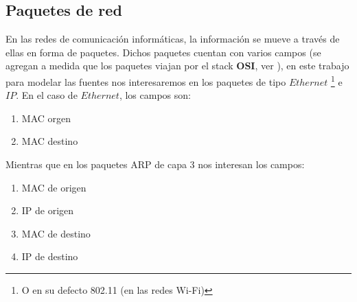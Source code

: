 \subsection{Paquetes de red}

En las redes de comunicación informáticas, la información se mueve a través de
ellas en forma de paquetes. Dichos paquetes cuentan con varios campos (se
agregan a medida que los paquetes viajan por el stack \textbf{OSI}, ver \cite[Capítulo 1, p.~32]{compnetworks}), en este
trabajo para modelar las fuentes nos interesaremos en los paquetes de tipo $Ethernet$ \footnote{O en su defecto 802.11 (en las redes Wi-Fi)} e $IP$. En el caso
de $Ethernet$, los campos son:

\begin{enumerate}
	\item MAC orgen
	\item MAC destino
\end{enumerate}

Mientras que en los paquetes ARP de capa 3 nos interesan los campos:

\begin{enumerate}
	\item MAC de origen
	\item IP de origen
	\item MAC de destino
	\item IP de destino
\end{enumerate}
